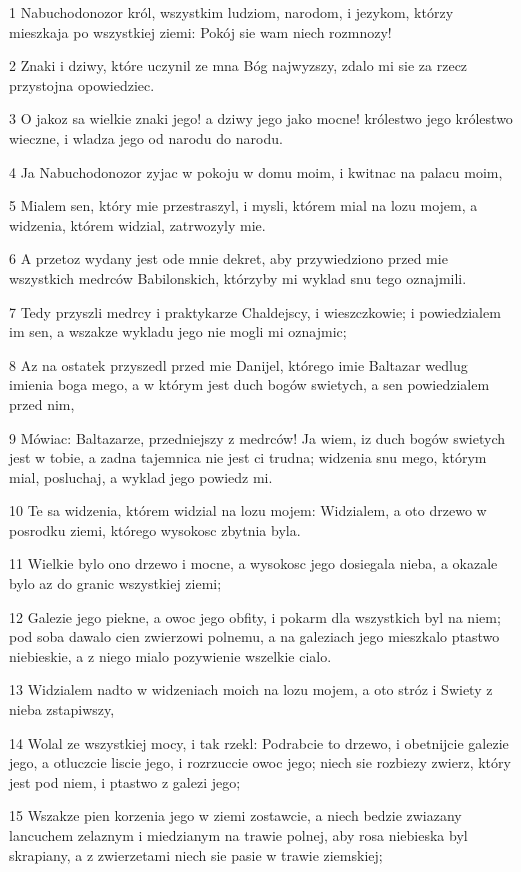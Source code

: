 \par 1 Nabuchodonozor król, wszystkim ludziom, narodom, i jezykom, którzy mieszkaja po wszystkiej ziemi: Pokój sie wam niech rozmnozy!
\par 2 Znaki i dziwy, które uczynil ze mna Bóg najwyzszy, zdalo mi sie za rzecz przystojna opowiedziec.
\par 3 O jakoz sa wielkie znaki jego! a dziwy jego jako mocne! królestwo jego królestwo wieczne, i wladza jego od narodu do narodu.
\par 4 Ja Nabuchodonozor zyjac w pokoju w domu moim, i kwitnac na palacu moim,
\par 5 Mialem sen, który mie przestraszyl, i mysli, którem mial na lozu mojem, a widzenia, którem widzial, zatrwozyly mie.
\par 6 A przetoz wydany jest ode mnie dekret, aby przywiedziono przed mie wszystkich medrców Babilonskich, którzyby mi wyklad snu tego oznajmili.
\par 7 Tedy przyszli medrcy i praktykarze Chaldejscy, i wieszczkowie; i powiedzialem im sen, a wszakze wykladu jego nie mogli mi oznajmic;
\par 8 Az na ostatek przyszedl przed mie Danijel, którego imie Baltazar wedlug imienia boga mego, a w którym jest duch bogów swietych, a sen powiedzialem przed nim,
\par 9 Mówiac: Baltazarze, przedniejszy z medrców! Ja wiem, iz duch bogów swietych jest w tobie, a zadna tajemnica nie jest ci trudna; widzenia snu mego, którym mial, posluchaj, a wyklad jego powiedz mi.
\par 10 Te sa widzenia, którem widzial na lozu mojem: Widzialem, a oto drzewo w posrodku ziemi, którego wysokosc zbytnia byla.
\par 11 Wielkie bylo ono drzewo i mocne, a wysokosc jego dosiegala nieba, a okazale bylo az do granic wszystkiej ziemi;
\par 12 Galezie jego piekne, a owoc jego obfity, i pokarm dla wszystkich byl na niem; pod soba dawalo cien zwierzowi polnemu, a na galeziach jego mieszkalo ptastwo niebieskie, a z niego mialo pozywienie wszelkie cialo.
\par 13 Widzialem nadto w widzeniach moich na lozu mojem, a oto stróz i Swiety z nieba zstapiwszy,
\par 14 Wolal ze wszystkiej mocy, i tak rzekl: Podrabcie to drzewo, i obetnijcie galezie jego, a otluczcie liscie jego, i rozrzuccie owoc jego; niech sie rozbiezy zwierz, który jest pod niem, i ptastwo z galezi jego;
\par 15 Wszakze pien korzenia jego w ziemi zostawcie, a niech bedzie zwiazany lancuchem zelaznym i miedzianym na trawie polnej, aby rosa niebieska byl skrapiany, a z zwierzetami niech sie pasie w trawie ziemskiej;
